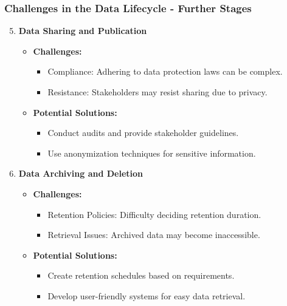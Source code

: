\documentclass[aspectratio=169]{beamer}
\begin{document}
\begin{frame}[fragile]
  \frametitle{Challenges in the Data Lifecycle - Further Stages}

  \begin{enumerate}
    \setcounter{enumi}{4}
    
    \item \textbf{Data Sharing and Publication}
      \begin{itemize}
        \item \textbf{Challenges:}
          \begin{itemize}
            \item Compliance: Adhering to data protection laws can be complex.
            \item Resistance: Stakeholders may resist sharing due to privacy.
          \end{itemize}
        \item \textbf{Potential Solutions:}
          \begin{itemize}
            \item Conduct audits and provide stakeholder guidelines.
            \item Use anonymization techniques for sensitive information.
          \end{itemize}
      \end{itemize}

    \item \textbf{Data Archiving and Deletion}
      \begin{itemize}
        \item \textbf{Challenges:}
          \begin{itemize}
            \item Retention Policies: Difficulty deciding retention duration.
            \item Retrieval Issues: Archived data may become inaccessible.
          \end{itemize}
        \item \textbf{Potential Solutions:}
          \begin{itemize}
            \item Create retention schedules based on requirements.
            \item Develop user-friendly systems for easy data retrieval.
          \end{itemize}
      \end{itemize}
  \end{enumerate}

\end{frame}
\end{document}
